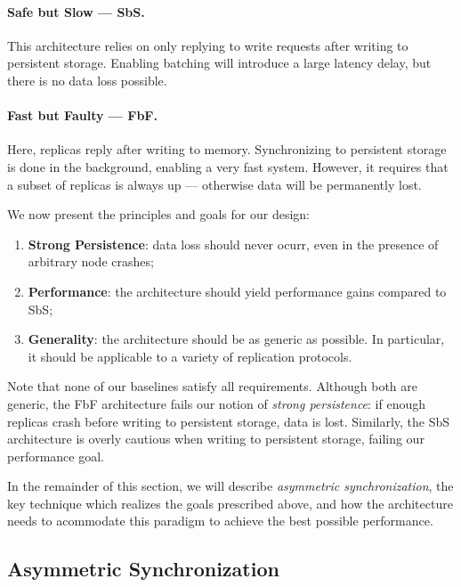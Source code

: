 \paragraph{Safe but Slow --- SbS.} This architecture relies on
only replying to write requests after writing to persistent
storage. Enabling batching will introduce a large latency delay,
but there is no data loss possible.

\paragraph{Fast but Faulty --- FbF.} Here, replicas reply after
writing to memory. Synchronizing to persistent storage is done in
the background, enabling a very fast system. However, it requires
that a subset of replicas is always up --- otherwise data will be
permanently lost.


We now present the principles and goals for our design:
\begin{enumerate}
    \item \textbf{Strong Persistence}: data loss should never
        ocurr, even in the presence of arbitrary node crashes;

    \item \textbf{Performance}: the architecture should yield
        performance gains compared to SbS\@;

    \item \textbf{Generality}: the architecture should be as
        generic as possible. In particular, it should be
        applicable to a variety of replication protocols.
\end{enumerate}

Note that none of our baselines satisfy all requirements.
Although both are generic, the FbF architecture fails our notion
of \emph{strong persistence}: if enough replicas crash before
writing to persistent storage, data is lost. Similarly, the SbS
architecture is overly cautious when writing to persistent
storage, failing our performance goal.

In the remainder of this section, we will describe
\emph{asymmetric synchronization}, the key technique which realizes the
goals prescribed above, and how the architecture needs to
acommodate this paradigm to achieve the best possible
performance.

\subsection{Asymmetric Synchronization}\label{ssec:asymmetric_synchronization}

